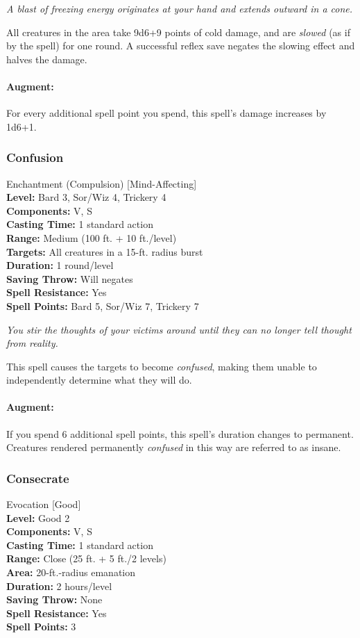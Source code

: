 \emph{A blast of freezing energy originates at your hand and extends outward in a cone.}

All creatures in the area take 9d6+9 points of cold damage, and are \emph{slowed} (as if by the  spell) for one round.
A successful reflex save negates the slowing effect and halves the damage.

\paragraph{Augment:} For every additional spell point you spend, this spell's damage increases by 1d6+1.
\subsubsection{Confusion}
\label{Spell:Confusion}
Enchantment (Compulsion) [Mind-Affecting]
\\ \textbf{Level:} Bard 3, Sor/Wiz 4, Trickery 4
\\ \textbf{Components:} V, S
\\ \textbf{Casting Time:} 1 standard action
\\ \textbf{Range:} Medium (100 ft. + 10 ft./level)
\\ \textbf{Targets:} All creatures in a 15-ft. radius burst
\\ \textbf{Duration:} 1 round/level
\\ \textbf{Saving Throw:} Will negates
\\ \textbf{Spell Resistance:} Yes
\\ \textbf{Spell Points:} Bard 5, Sor/Wiz 7, Trickery 7

\emph{You stir the thoughts of your victims around until they can no longer tell thought from reality.}

This spell causes the targets to become \emph{confused}, making them unable to independently determine what they will do.

\paragraph{Augment:} If you spend 6 additional spell points, this spell's duration changes to permanent.
Creatures rendered permanently \emph{confused} in this way are referred to as insane.
\subsubsection{Consecrate}
\label{Spell:Consecrate}
Evocation [Good]
\\ \textbf{Level:} Good 2
\\ \textbf{Components:} V, S
\\ \textbf{Casting Time:} 1 standard action
\\ \textbf{Range:} Close (25 ft. + 5 ft./2 levels)
\\ \textbf{Area:} 20-ft.-radius emanation
\\ \textbf{Duration:} 2 hours/level
\\ \textbf{Saving Throw:} None
\\ \textbf{Spell Resistance:} Yes
\\ \textbf{Spell Points:} 3

